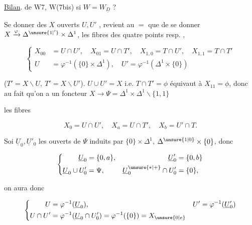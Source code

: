 




\uline{Bilan}. de W7, W(7bis) si $W=W_{\underline D}$ ?

Se donner des $X$ ouverts $U,U'$ , revient au $=$ que de se donner $X\xrightarrow{\varphi}\Delta^{\unsure{1|'}}\times\Delta^1$, les fibres des quatre points  resp. ,

\[
\left\{\begin{aligned}
 X_{00}&=U\cap U',\quad X_{01}=U\cap T',\quad X_{1,0}=T\cap U',\quad X_{1,1}=T\cap T'\\
 U&=\varphi^{-1}(\{0\}\times\Delta^1),\quad U'=\varphi^{-1}(\Delta^1\times\{0\})
\end{aligned}\right.
\]

 ($T'=X\smallsetminus U,\ T'=X\smallsetminus U'$).  $U\cup U'=X$ i.e. $T\cap T'=\phi$ équivaut à $X_{11}=\phi$, donc au fait qu'on a un foncteur $X\to\Psi=\Delta^1\times\Delta^1\smallsetminus\{1,1\}$


les fibres 

\[
 X_0=U\cap U',\quad X_a=U\cap T',\quad X_b=U'\cap T.
\]

Soi $\underline U_0,\underline U'_0$ les ouverts de $\Psi$ induits par $\{0\}\times\Delta^1$, $\Delta^{\unsure{1|0}}\times\{0\}$, donc

\[
 \left\{\begin{aligned}
 \underline U_0&=\{0,a\}, &\underline U'_0&=\{0,b\}\\
 \underline U_0\cup U'_0&=\Psi, &\underline U_0^{\unsure{*|+}}\cap U'_0&=\{0\},
 \end{aligned}\right.
\]

on aura donc

\[
 \left\{\begin{aligned}
 U&=\varphi^{-1}(\underline U_0), & U'&=\varphi^{-1}(\underline U'_0)\\
 U\cap U'&=\varphi^{-1}(\underline U_0\cap U'_0)=\varphi^{-1}(\{0\})=X_{\unsure{0|e}}
 \end{aligned}\right.
\]

